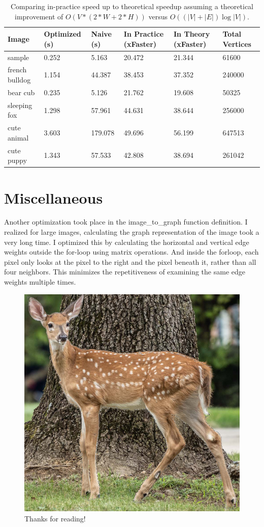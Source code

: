 \documentclass[11pt]{article}
\begin{document}
\begin{table}[H]
\begin{tabular}{|l|l|l|l|l|l|}
\hline
Image & Optimized (s) & Naive (s) & In Practice (xFaster) & In Theory (xFaster) & Total Vertices \\ \hline
sample & 0.252 &  5.163 & 20.472 & 21.344 & 61600\\ \hline
french bulldog & 1.154 &   44.387 & 38.453 &  37.352 & 240000\\ \hline
bear cub & 0.235 &   5.126 & 21.762 & 19.608 & 50325\\ \hline
sleeping fox & 1.298 &   57.961 & 44.631 &  38.644 & 256000\\ \hline
cute animal & 3.603 &  179.078 & 49.696 &  56.199 & 647513\\ \hline
cute puppy & 1.343 &  57.533 &  42.808 & 38.694 & 261042\\ \hline
\end{tabular}
\caption{\label{table:right_complexity} Comparing in-practice speed up to theoretical speedup assuming a theoretical improvement of $O(V*(2*W+2*H))$ versus $O((|V|+|E|)\log|V|)$.}
\end{table}

\section{Miscellaneous}
Another optimization took place in the image\_to\_graph function definition. I realized for large images, calculating the graph representation of the image took a very long time. I optimized this by calculating the horizontal and vertical edge weights outside the for-loop using matrix operations. And inside the forloop, each pixel only looks at the pixel to the right and the pixel beneath it, rather than all four neighbors. This minimizes the repetitiveness of examining the same edge weights multiple times.


\begin{figure}[H]
	\centering
	\includegraphics[scale=0.8]{deer_cut.png}
	\caption{\label{fig:visited_show} Thanks for reading!}
\end{figure}
\end{document}

